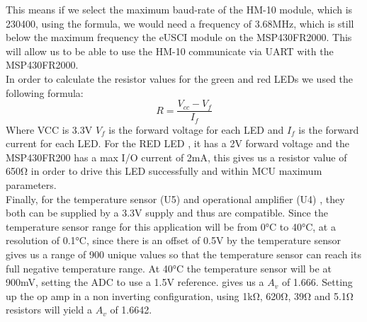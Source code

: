 This means if we select the maximum baud-rate of the HM-10 module, which is 230400, using the formula, we would need a frequency of 3.68MHz, which is still below the maximum frequency the eUSCI module on the MSP430FR2000. This will allow us to be able to use the HM-10 communicate via UART with the MSP430FR2000.\\
In order to calculate the resistor values for the green and red LEDs we used the following formula:
\begin{equation}
R = \frac{V_{cc} - V_{f}}{I_{f}}
\end{equation}
Where VCC is 3.3\si{\V} $V_{f}$ is the forward voltage for each LED and $I_{f}$ is the forward current for each LED. For the RED LED \cite{SSLLX3052ID}, it has a 2\si{\V} forward voltage and the MSP430FR200 has a max I/O current of 2\si{\mA}, this gives us a resistor value of  650\si{\ohm} in order to drive this LED successfully and within MCU maximum parameters.\\
Finally, for the temperature sensor (U5) \cite{TMP36GT9Z} and operational amplifier (U4) \cite{MCP6022I}, they both can be supplied by a 3.3\si{\V} supply and thus are compatible. Since the temperature sensor range for this application will be from 0\si{\celsius} to 40\si{\celsius}, at a resolution of 0.1\si{\celsius}, since there is an offset of 0.5\si{\V} by the temperature sensor gives us a range of 900 unique values so that the temperature sensor can reach its full negative temperature range. At 40\si{\celsius} the temperature sensor will be at 900\si{\milli\volt}, setting the ADC to use a 1.5\si{\V} reference. gives us a $A_{v}$ of 1.666. Setting up the op amp in a non inverting configuration, using 1\si{\kilo\ohm}, 620\si{\ohm}, 39\si{\ohm} and 5.1\si{\ohm} resistors will yield a $A_{v}$ of 1.6642.
